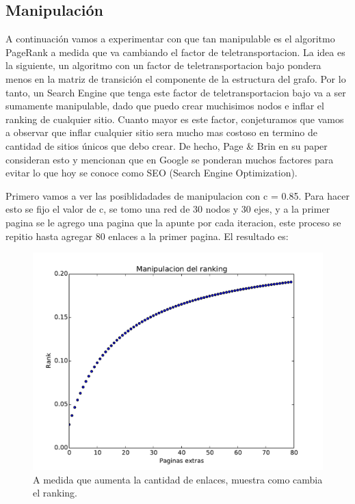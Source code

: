 \pagebreak
\subsection{Manipulación}

A continuación vamos a experimentar con que tan manipulable es el algoritmo PageRank a medida que va cambiando el factor de teletransportacion. La idea es la siguiente, un algoritmo con un factor de teletransportacion bajo pondera menos en la matriz de transición el componente de la estructura del grafo. Por lo tanto, un Search Engine que tenga este factor de teletransportacion bajo va a ser sumamente manipulable, dado que puedo crear muchisimos nodos e inflar el ranking de cualquier sitio. Cuanto mayor es este factor, conjeturamos que vamos a observar que inflar cualquier sitio sera mucho mas costoso en termino de cantidad de sitios únicos que debo crear. De hecho, Page \& Brin en su paper consideran esto y mencionan que en Google se ponderan muchos factores para evitar lo que hoy se conoce como SEO (Search Engine Optimization).

Primero vamos a ver las posiblidadades de manipulacion con c = 0.85. Para hacer esto se fijo el valor de c, se tomo una red de 30 nodos y 30 ejes, y a la primer pagina se le agrego una pagina que la apunte por cada iteracion, este proceso se repitio hasta agregar 80 enlaces a la primer pagina. El resultado es:

\begin{figure}[H]
\centering
\includegraphics[scale=0.7]{images/manipulacion.pdf}
\caption{A medida que aumenta la cantidad de enlaces, muestra como cambia el ranking.}
\label{timePageRank}
\end{figure}

